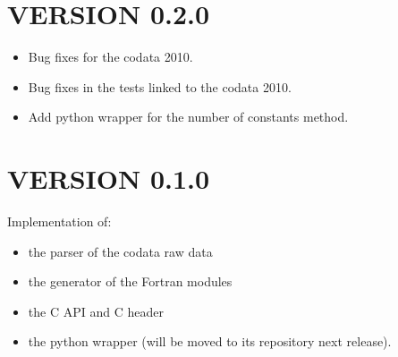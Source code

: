 \section*{VERSION 0.2.0}
\begin{itemize}
\item Bug fixes for the codata 2010.
\item Bug fixes in the tests linked to the codata 2010.
\item Add python wrapper for the number of constants method.
\end{itemize}



\section*{VERSION 0.1.0}
Implementation of:
\begin{itemize}
\item the parser of the codata raw data
\item the generator of the Fortran modules
\item the C API and C header
\item the python wrapper (will be moved to its repository next release).
\end{itemize}
